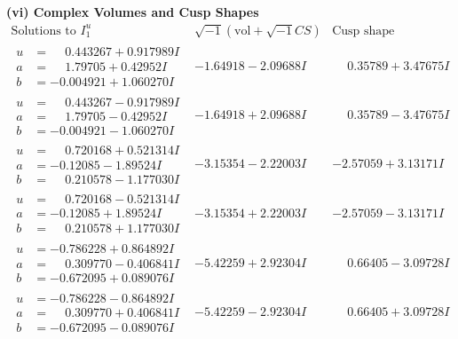 \documentclass[1p]{elsarticle_modified}
\theoremstyle{definition}
\newcommand{\I}{\sqrt{-1}}
\begin{document}
\newpage\flushleft \textbf{(vi) Complex Volumes and Cusp Shapes}
$$\begin{array}{c|c|c}  
\text{Solutions to }I^u_{1}& \I (\text{vol} + \sqrt{-1}CS) & \text{Cusp shape}\\
 \hline 
\begin{aligned}
u &= \phantom{-}0.443267 + 0.917989 I \\
a &= \phantom{-}1.79705 + 0.42952 I \\
b &= -0.004921 + 1.060270 I\end{aligned}
 & -1.64918 - 2.09688 I & \phantom{-}0.35789 + 3.47675 I \\ \hline\begin{aligned}
u &= \phantom{-}0.443267 - 0.917989 I \\
a &= \phantom{-}1.79705 - 0.42952 I \\
b &= -0.004921 - 1.060270 I\end{aligned}
 & -1.64918 + 2.09688 I & \phantom{-}0.35789 - 3.47675 I \\ \hline\begin{aligned}
u &= \phantom{-}0.720168 + 0.521314 I \\
a &= -0.12085 - 1.89524 I \\
b &= \phantom{-}0.210578 - 1.177030 I\end{aligned}
 & -3.15354 - 2.22003 I & -2.57059 + 3.13171 I \\ \hline\begin{aligned}
u &= \phantom{-}0.720168 - 0.521314 I \\
a &= -0.12085 + 1.89524 I \\
b &= \phantom{-}0.210578 + 1.177030 I\end{aligned}
 & -3.15354 + 2.22003 I & -2.57059 - 3.13171 I \\ \hline\begin{aligned}
u &= -0.786228 + 0.864892 I \\
a &= \phantom{-}0.309770 - 0.406841 I \\
b &= -0.672095 + 0.089076 I\end{aligned}
 & -5.42259 + 2.92304 I & \phantom{-}0.66405 - 3.09728 I \\ \hline\begin{aligned}
u &= -0.786228 - 0.864892 I \\
a &= \phantom{-}0.309770 + 0.406841 I \\
b &= -0.672095 - 0.089076 I\end{aligned}
 & -5.42259 - 2.92304 I & \phantom{-}0.66405 + 3.09728 I \\ \hline\begin{aligned}

\end{aligned}
\end{array}$$
\end{document}
